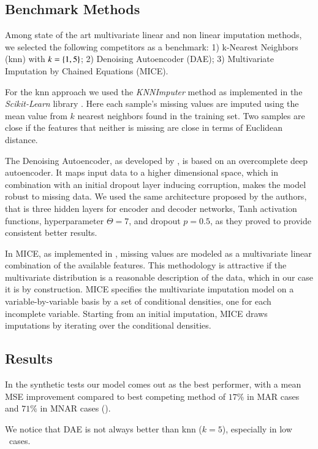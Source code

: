 \subsection{Benchmark Methods}
Among state of the art multivariate linear and non linear imputation methods, we selected the following competitors as a benchmark:
1) k-Nearest Neighbors (knn) with $k=\left\{1, 5\right\}$;
2) Denoising Autoencoder (DAE);
3) Multivariate Imputation by Chained Equations (MICE).

For the knn approach we used the \textit{KNNImputer} method as implemented in the \textit{Scikit-Learn} library \citep{sklearn}.
Here each sample's missing values are imputed using the mean value from $k$ nearest neighbors found in the training set.
Two samples are close if the features that neither is missing are close in terms of Euclidean distance.

The Denoising Autoencoder, as developed by \cite{dae}, is based on an overcomplete deep autoencoder.
It maps input data to a higher dimensional space, which in combination with an initial dropout layer inducing corruption, makes the model robust to missing data.
We used the same architecture proposed by the authors, that is three hidden layers for encoder and decoder networks, Tanh activation functions, hyperparameter $\Theta=7$, and dropout $p=0.5$, as they proved to provide consistent better results.

In MICE, as implemented in \cite{mice}, missing values are modeled as a multivariate linear combination of the available features.
This methodology is attractive if the multivariate distribution is a reasonable description of the data, which in our case it is by construction.
MICE specifies the multivariate imputation model on a variable-by-variable basis by a set of conditional densities, one for each incomplete variable.
Starting from an initial imputation, MICE draws imputations by iterating over the conditional densities.

\subsection{Results}


In the synthetic tests our model comes out as the best performer, with a mean MSE improvement compared to best competing method of $17\%$ in MAR cases and $71\%$ in MNAR cases ().

We notice that DAE is not always better than knn ($k=5$), especially in low \snr\ cases.

